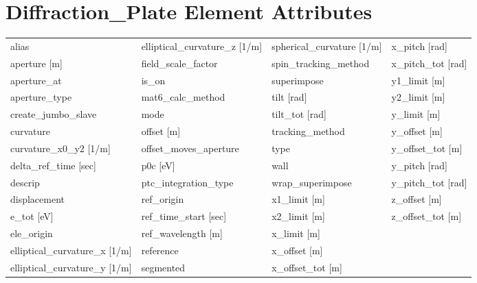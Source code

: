  \vfill
 
 \section{Diffraction_Plate Element Attributes}
 \label{s:list.diffraction.plate}
 
 \begin{tabular}{llll} \toprule
alias                            & elliptical_curvature_z [1/m]     & spherical_curvature [1/m]        & x_pitch [rad]                    \\
aperture [m]                     & field_scale_factor               & spin_tracking_method             & x_pitch_tot [rad]                \\
aperture_at                      & is_on                            & superimpose                      & y1_limit [m]                     \\
aperture_type                    & mat6_calc_method                 & tilt [rad]                       & y2_limit [m]                     \\
create_jumbo_slave               & mode                             & tilt_tot [rad]                   & y_limit [m]                      \\
curvature                        & offset [m]                       & tracking_method                  & y_offset [m]                     \\
curvature_x0_y2 [1/m]            & offset_moves_aperture            & type                             & y_offset_tot [m]                 \\
delta_ref_time [sec]             & p0c [eV]                         & wall                             & y_pitch [rad]                    \\
descrip                          & ptc_integration_type             & wrap_superimpose                 & y_pitch_tot [rad]                \\
displacement                     & ref_origin                       & x1_limit [m]                     & z_offset [m]                     \\
e_tot [eV]                       & ref_time_start [sec]             & x2_limit [m]                     & z_offset_tot [m]                 \\
ele_origin                       & ref_wavelength [m]               & x_limit [m]                      &                                  \\
elliptical_curvature_x [1/m]     & reference                        & x_offset [m]                     &                                  \\
elliptical_curvature_y [1/m]     & segmented                        & x_offset_tot [m]                 &                                  \\
 \bottomrule
 \end{tabular}
 \vfill
 
